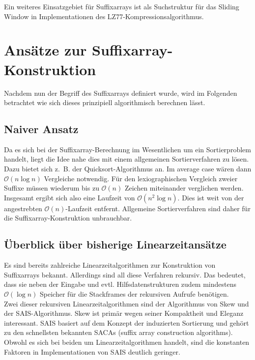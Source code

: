 \documentclass[twoside,a4paper,11pt]{article}
\theoremstyle{break}
\begin{document}
Ein weiteres Einsatzgebiet für Suffixarrays ist als Suchstruktur für das Sliding Window in Implementationen des LZ77-Kompressionsalgorithmus.

\section{Ansätze zur Suffixarray-Konstruktion}

Nachdem nun der Begriff des Suffixarrays definiert wurde, wird im Folgenden betrachtet wie sich dieses prinzipiell algorithmisch berechnen lässt.

\subsection{Naiver Ansatz}

Da es sich bei der Suffixarray-Berechnung im Wesentlichen um ein Sortierproblem handelt, liegt die Idee nahe dies mit einem allgemeinen Sortierverfahren zu lösen. Dazu bietet sich z.~B. der Quicksort-Algorithmus an. Im average case wären dann $\mathcal{O}(n \log n)$ Vergleiche notwendig. Für den lexiographischen Vergleich zweier Suffixe müssen wiederum bis zu $\mathcal{O}(n)$ Zeichen miteinander verglichen werden. Insgesamt ergibt sich also eine Laufzeit von $\mathcal{O}(n^2 \log n)$. Dies ist weit von der angestrebten $\mathcal{O}(n)$-Laufzeit entfernt. Allgemeine Sortierverfahren sind daher für die Suffixarray-Konstruktion unbrauchbar.

\subsection{Überblick über bisherige Linearzeitansätze}

Es sind bereits zahlreiche Linearzeitalgorithmen zur Konstruktion von Suffixarrays bekannt. Allerdings sind all diese Verfahren rekursiv. Das bedeutet, dass sie neben der Eingabe und evtl. Hilfsdatenstrukturen zudem mindestens $\mathcal{O}(\log n)$ Speicher für die Stackframes der rekursiven Aufrufe benötigen.\\

Zwei dieser rekursiven Linearzeitalgorithmen sind der Algorithmus von Skew und der SAIS-Algorithmus. Skew ist primär wegen seiner Kompaktheit und Eleganz interessant. SAIS basiert auf dem Konzept der induzierten Sortierung und gehört zu den schnellsten bekannten SACAs (suffix array construction algorithms). Obwohl es sich bei beiden um Linearzeitalgorithmen handelt, sind die konstanten Faktoren in Implementationen von SAIS deutlich geringer.
\end{document}
